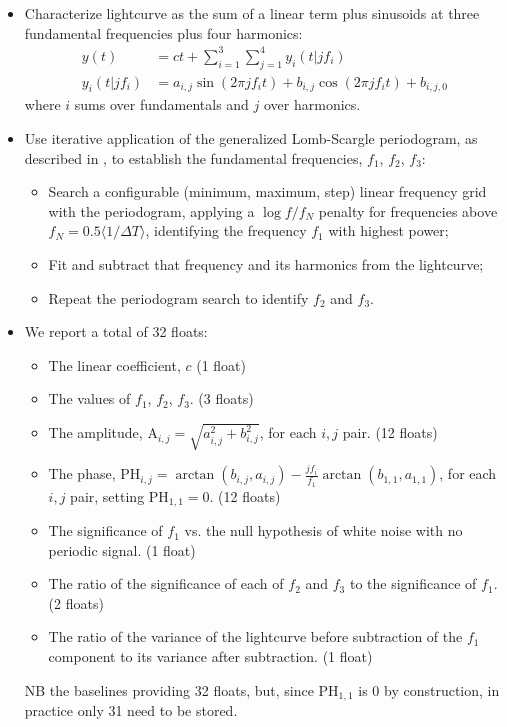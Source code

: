 \documentclass[DM,authoryear,toc]{lsstdoc}
\begin{document}
\begin{displayquote}
\begin{itemize}
\item{Characterize lightcurve as the sum of a linear term plus sinusoids at three fundamental frequencies plus four harmonics:
\begin{align}
y(t) &= ct + \sum_{i=1}^{3} \sum_{j=1}^{4} y_i(t|j f_i) \\
y_i(t|j f_i) &= a_{i,j} \sin(2 \pi j f_i t) + b_{i, j} \cos(2 \pi j f_i t) + b_{i, j, 0}
\end{align}
where $i$ sums over fundamentals and $j$ over harmonics.
}
\item{Use iterative application of the generalized Lomb-Scargle periodogram, as described in \cite{2011ApJ...733...10R}, to establish the fundamental frequencies, $f_1$, $f_2$, $f_3$:
\begin{itemize}
  \item{Search a configurable (minimum, maximum, step) linear frequency grid with the periodogram, applying a $\log f/f_N$ penalty for frequencies above $f_N = 0.5 \langle 1 / \Delta T \rangle$, identifying the frequency $f_1$ with highest power;}
  \item{Fit and subtract that frequency and its harmonics from the lightcurve;}
  \item{Repeat the periodogram search to identify $f_2$ and $f_3$.}
\end{itemize}
}
\item{We report a total of 32 floats:
  \begin{itemize}
  \item{The linear coefficient, $c$ (1 float)}
  \item{The values of $f_1$, $f_2$, $f_3$. (3 floats)}
  \item{The amplitude, $\mathrm{A}_{i, j} = \sqrt{a_{i, j}^2 + b_{i, j}^2}$, for each $i, j$ pair. (12 floats)}
  \item{The phase, $\mathrm{PH}_{i, j} = \arctan(b_{i, j}, a_{i, j}) - \frac{j f_i}{f_1} \arctan(b_{1,1}, a_{1,1})$, for each $i, j$ pair, setting $\mathrm{PH}_{1, 1} = 0$. (12 floats)}
  \item{The significance of $f_1$ vs. the null hypothesis of white noise with no periodic signal. (1 float)}
  \item{The ratio of the significance of each of $f_2$ and $f_3$ to the significance of $f_1$. (2 floats)}
  \item{The ratio of the variance of the lightcurve before subtraction of the $f_1$ component to its variance after subtraction. (1 float)}
  \end{itemize}
NB the \DPDD{} baselines providing 32 floats, but, since $\mathrm{PH}_{1,1}$ is 0 by construction, in practice only 31 need to be stored.
}
\end{itemize}


\end{displayquote}
\end{document}
